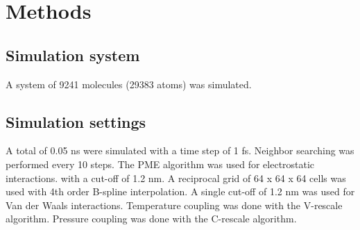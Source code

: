 \section{Methods}
\subsection{Simulation system}
A system of 9241 molecules (29383 atoms) was simulated.

\subsection{Simulation settings}
A total of 0.05 ns were simulated with a time step of 1 fs.
Neighbor searching was performed every 10 steps.
The PME algorithm was used for electrostatic interactions.
with a cut-off of 1.2 nm.
A reciprocal grid of 64 x 64 x 64 cells was used with 4th order B-spline interpolation.
A single cut-off of 1.2 nm was used for Van der Waals interactions.
Temperature coupling was done with the V-rescale algorithm.
Pressure coupling was done with the C-rescale algorithm.
